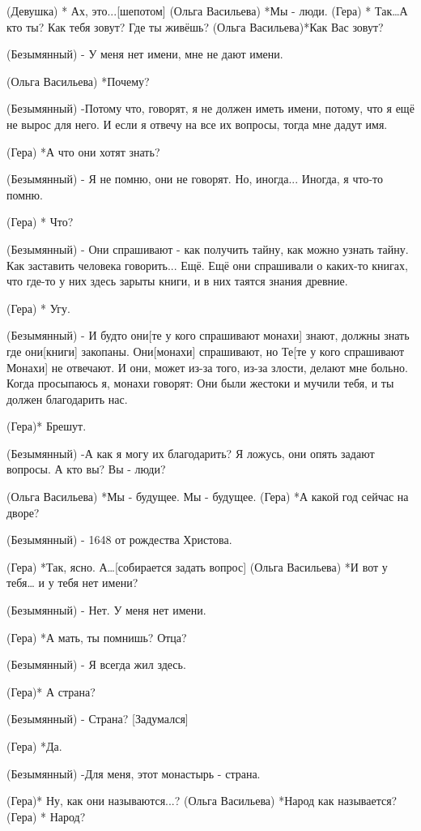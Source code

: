 (Девушка) * Ах, это...[шепотом]
(Ольга Васильева) *Мы - люди.
(Гера) * Так…А кто ты? Как тебя зовут? Где ты живёшь?
(Ольга Васильева)*Как Вас зовут?

(Безымянный) - У меня нет имени, мне не дают имени.

(Ольга Васильева) *Почему?

(Безымянный) -Потому что, говорят,  я не должен иметь имени, потому, что я ещё не вырос для него. И если я отвечу на все их вопросы, тогда мне дадут имя.

(Гера) *А что они хотят знать?

(Безымянный) - Я не помню, они не говорят. Но, иногда... Иногда, я что-то помню.  

(Гера) * Что?

(Безымянный) - Они спрашивают - как получить тайну, как можно узнать тайну. Как заставить человека говорить... Ещё. Ещё  они спрашивали о каких-то книгах, что где-то у них здесь зарыты книги, и в них таятся знания древние. 

(Гера) * Угу.

(Безымянный) - И будто они[те у кого спрашивают монахи] знают, должны знать где они[книги] закопаны.  Они[монахи] спрашивают, но Те[те у кого спрашивают Монахи] не отвечают. И они, может из-за того, из-за злости, делают мне больно. Когда просыпаюсь я, монахи говорят: Они были жестоки и мучили тебя, и ты должен благодарить нас. 

(Гера)* Брешут.

(Безымянный) -А как я могу их благодарить? Я ложусь, они опять задают вопросы. А кто вы? Вы - люди?

(Ольга Васильева) *Мы - будущее. Мы - будущее.
(Гера) *А какой год сейчас на дворе?

(Безымянный) - 1648 от рождества Христова.

(Гера) *Так, ясно. А…[собирается задать вопрос]
(Ольга Васильева) *И вот у тебя… и у тебя нет имени?

(Безымянный) - Нет. У меня нет имени.

(Гера) *А мать, ты помнишь? Отца?

(Безымянный) - Я всегда жил здесь.

(Гера)* А страна? 

(Безымянный) - Страна? [Задумался]

(Гера) *Да.

(Безымянный) -Для меня, этот монастырь - страна.

(Гера)* Ну, как они называются...?
(Ольга Васильева) *Народ как называется? 
(Гера) * Народ? 

